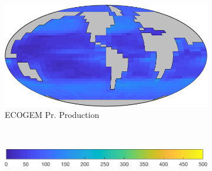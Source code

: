 \documentclass{article}
\begin{document}
\begin{figure}[htbp]
\begin{subfigure}{.5\textwidth}
\end{subfigure}%
\begin{subfigure}{.5\textwidth}
 \caption{ECOGEM Pr. Production}
\includegraphics[width=0.95\linewidth]{../Separate_figures/ECOGEM/PrimaryProdn.png}
\end{subfigure}%
\\[+0.2cm]
\begin{subfigure}{.5\textwidth}
 \includegraphics[width=0.95\linewidth]{../Separate_figures/ECOGEM/PrimaryProdn_clrbar.png}
\end{subfigure}
\end{figure}
\end{document}
